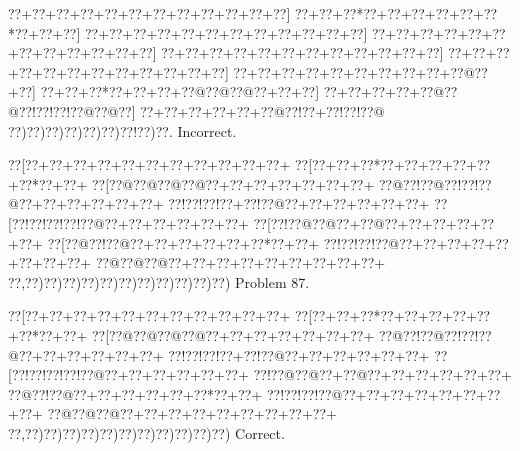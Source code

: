 \documentclass[a5paper]{article}
\begin{document}
\begin{center}
{\goo
\0??+\0??+\0??+\0??+\0??+\0??+\0??+\0??+\0??+\0??+\0??+\0??]
\0??+\0??+\0??*\0??+\0??+\0??+\0??+\0??+\0??*\0??+\0??+\0??]
\0??+\0??+\0??+\0??+\0??+\0??+\0??+\0??+\0??+\0??+\0??+\0??]
\0??+\0??+\0??+\0??+\0??+\0??+\0??+\0??+\0??+\0??+\0??+\0??]
\0??+\0??+\0??+\0??+\0??+\0??+\0??+\0??+\0??+\0??+\0??+\0??]
\0??+\0??+\0??+\0??+\0??+\0??+\0??+\0??+\0??+\0??+\0??+\0??]
\0??+\0??+\0??+\0??+\0??+\0??+\0??+\0??+\0??+\0??@\0??+\0??]
\0??+\0??+\0??*\0??+\0??+\0??+\0??@\0??@\0??@\0??+\0??+\0??]
\0??+\0??+\0??+\0??+\0??@\0??@\0??!\0??!\0??!\0??@\0??@\0??]
\0??+\0??+\0??+\0??+\0??+\0??@\0??!\0??+\0??!\0??!\0??@
\0??)\0??)\0??)\0??)\0??)\0??)\0??!\0??)\0??.
}
Incorrect. 

\end{center}
\newpage
\begin{center}
{\goo
\0??[\0??+\0??+\0??+\0??+\0??+\0??+\0??+\0??+\0??+\0??+\0??+
\0??[\0??+\0??+\0??*\0??+\0??+\0??+\0??+\0??+\0??*\0??+\0??+
\0??[\0??@\0??@\0??@\0??@\0??+\0??+\0??+\0??+\0??+\0??+\0??+
\0??@\0??!\0??@\0??!\0??!\0??@\0??+\0??+\0??+\0??+\0??+\0??+
\0??!\0??!\0??!\0??+\0??!\0??@\0??+\0??+\0??+\0??+\0??+\0??+
\0??[\0??!\0??!\0??!\0??!\0??@\0??+\0??+\0??+\0??+\0??+\0??+
\0??[\0??!\0??@\0??@\0??+\0??@\0??+\0??+\0??+\0??+\0??+\0??+
\0??[\0??@\0??!\0??@\0??+\0??+\0??+\0??+\0??+\0??*\0??+\0??+
\0??!\0??!\0??!\0??@\0??+\0??+\0??+\0??+\0??+\0??+\0??+\0??+
\0??@\0??@\0??@\0??+\0??+\0??+\0??+\0??+\0??+\0??+\0??+\0??+
\0??,\0??)\0??)\0??)\0??)\0??)\0??)\0??)\0??)\0??)\0??)\0??)
}
Problem 87.

\end{center}
\begin{center}
{\goo
\0??[\0??+\0??+\0??+\0??+\0??+\0??+\0??+\0??+\0??+\0??+\0??+
\0??[\0??+\0??+\0??*\0??+\0??+\0??+\0??+\0??+\0??*\0??+\0??+
\0??[\0??@\0??@\0??@\0??@\0??+\0??+\0??+\0??+\0??+\0??+\0??+
\0??@\0??!\0??@\0??!\0??!\0??@\0??+\0??+\0??+\0??+\0??+\0??+
\0??!\0??!\0??!\0??+\0??!\0??@\0??+\0??+\0??+\0??+\0??+\0??+
\0??[\0??!\0??!\0??!\0??!\0??@\0??+\0??+\0??+\0??+\0??+\0??+
\0??!\0??@\0??@\0??+\0??@\0??+\0??+\0??+\0??+\0??+\0??+
\0??@\0??!\0??@\0??+\0??+\0??+\0??+\0??+\0??*\0??+\0??+
\0??!\0??!\0??!\0??@\0??+\0??+\0??+\0??+\0??+\0??+\0??+\0??+
\0??@\0??@\0??@\0??+\0??+\0??+\0??+\0??+\0??+\0??+\0??+\0??+
\0??,\0??)\0??)\0??)\0??)\0??)\0??)\0??)\0??)\0??)\0??)\0??)
}
Correct. 

\end{center}
\end{document}
